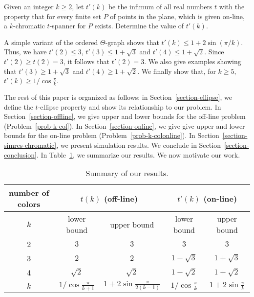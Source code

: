 \documentclass[pdftex,leqno,fleqn,12pts]{llncs}
\begin{document}
\begin{problem}
\label{prob-k-colonline}
Given an integer $k \geq 2$, let $t'(k)$ be the infimum of all real
numbers $t$ with the property that for every finite set $P$ of points in 
the plane, which is given on-line, a $k$-chromatic $t$-spanner for 
$P$ exists. Determine the value of $t'(k)$.
\end{problem}

A simple variant of the ordered $\Theta$-graph shows that 
$t'(k) \leq 1 + 2 \sin (\pi/k)$. Thus, we have 
$t'(2) \leq 3$, $t'(3) \leq 1 + \sqrt{3}$ and $t'(4) \leq 1 + \sqrt{2}$. 
Since $t'(2) \geq t(2) = 3$, it follows that $t'(2) = 3$. 
We also give examples showing that $t'(3) \ge 1 + \sqrt{3}$ and 
$t'(4) \ge 1 + \sqrt{2}$. We finally show that, for $k \geq 5$,   
$t'(k) \geq 1 / \cos \frac{\pi}{k}$. 

The rest of this paper is organized as follows: in Section~\ref{section-ellipse}, we define the $t$-ellipse property and show its relationship to our problem. In Section~\ref{section-offline}, we give upper and lower bounds for the off-line problem (Problem~\ref{prob-k-col}). In Section~\ref{section-online}, we give give upper and lower bounds for the on-line problem (Problem~\ref{prob-k-colonline}). In Section~\ref{section-simres-chromatic}, we present simulation results. We conclude in Section~\ref{section-conclusion}. In Table~\ref{tab-summary}, we summarize our results. We now motivate our work.



\begin{table}
\begin{center}
\begin{tabular}{|c|c|c|c|c|}\hline
number of colors & 
         \multicolumn{2}{c|}{$t(k)$ (off-line)} & 
         \multicolumn{2}{c|}{$t'(k)$ (on-line)} \\ 
\hline 
$k$    & lower bound & upper bound & lower bound   & upper bound  \\ 
\hline  
2      & $3$         & $3$         & $3$           & $3$        \\ 
\hline 
3      & $2$         & $2$         & $1+\sqrt{3}$  & $1+\sqrt{3}$\\ 
\hline 
4      & $\sqrt{2}$  & $\sqrt{2}$  & $1+\sqrt{2}$  & $1+\sqrt{2}$ \\ 
\hline 
$k$   & $1/ \cos{\frac{\pi}{k+1}}$ & $1+2\sin{\frac{\pi}{2(k-1)}}$ & $1/ \cos{\frac{\pi}{k}}$ & $1+2\sin{\frac{\pi}{k}}$\\
\hline
\end{tabular}
\end{center}
\caption{Summary of our results.}
\label{tab-summary}
\end{table}
\end{document}
